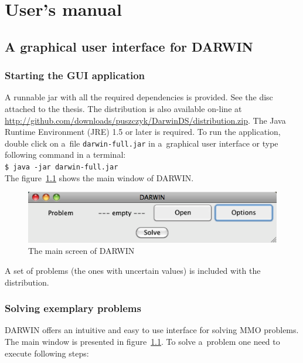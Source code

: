 \chapter{User's manual}
\label{user-manual}

\section*{A graphical user interface for DARWIN}

\subsection*{Starting the GUI application}

A runnable jar with all the required dependencies is provided. See the disc
attached to the thesis. The distribution is also available on-line at
\url{http://github.com/downloads/puszczyk/DarwinDS/distribution.zip}. The Java
Runtime Environment (JRE) 1.5 or later is required. To run the application,
double click on a~file \texttt{darwin-full.jar} in a~graphical user interface
or type following command in a terminal:\\
\texttt{\$ java -jar darwin-full.jar} \\
The figure~\ref{manual_01_main} shows the main window of DARWIN.

\begin{figure}[htb]
  \centering
  \includegraphics[scale=0.7]{img/manual/01_main_screen}
  \caption{The main screen of DARWIN}
  \label{manual_01_main}
\end{figure}

A set of problems (the ones with uncertain values) is included with the
distribution.

\subsection*{Solving exemplary problems}

DARWIN offers an intuitive and easy to use interface for solving MMO
problems. The main window is presented in figure~\ref{manual_01_main}. To
solve a~problem one need to execute following steps:

